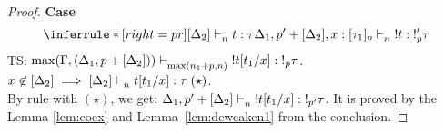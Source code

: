 \documentclass{article}
\begin{document}
\begin{proof}
\noindent \textbf{Case}
\[
\inferrule*[right = pr]
   {[\Delta_2] \jtype{n}{}{t}{\tau}}
   {\Delta_1, p' + [\Delta_2], x:[\tau_1]_p\jtype{n}{}{!t}{!_p' \tau}  }
\]
TS: $\max(\Gamma,(\Delta_1, p+[\Delta_2]) ) \mathrel{\vdash_{\max(n_1 + p, n)}^{} {!t[t_1/x]} : {!_p \tau}}$.\\
$x \not \in [\Delta_2] \implies [\Delta_2] \jtype{n}{}{t[t_1/x]}{\tau}(\star)$.\\
By rule  with $(\star)$, we get: $\Delta_1, p'+[\Delta_2] \mathrel{\vdash_{n}^{} {!t[t_1/x]} : {!_{p'} \tau}} $.
It is proved by the Lemma \ref{lem:coex} and Lemma~\ref{lem:deweaken1} from the conclusion.


\end{proof}
\end{document}
